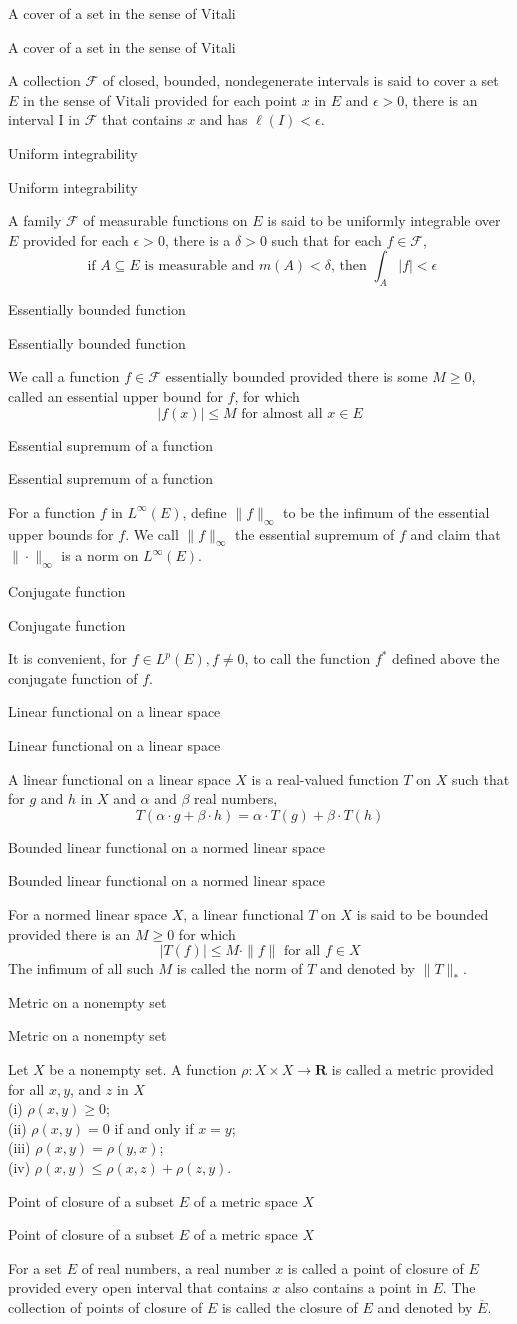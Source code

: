 \documentclass[17pt]{extarticle}
\renewcommand{\bar}[1]{\overline{#1}}
\newcommand{\boxset}[2]{\begin{mdframed}[style=darkQuesion]
#1
\end{mdframed}
\newpage
\begin{mdframed}[style=darkQuesion]
#1
  \end{mdframed}
\begin{mdframed}[style=darkAnswer]
#2
  \end{mdframed}
  \newpage
}
\begin{document}
\boxset{A cover of a set in the sense of Vitali}
{
A collection $\mathcal{F}$ of closed, bounded, nondegenerate intervals is said to cover a set $E$ in the sense of Vitali provided for each point $x$ in $E$ and $\epsilon>0$, there is an interval I in $\mathcal{F}$ that contains $x$ and has $\ell(I)<\epsilon$.
}
\boxset{Uniform integrability}
{
A family $\mathcal{F}$ of measurable functions on $E$ is said to be uniformly integrable over $E$ provided for each $\epsilon>0$, there is a $\delta>0$ such that for each $f \in \mathcal{F}$,
$$
\text { if } A \subseteq E \text { is measurable and } m(A)<\delta \text {, then } \int_{A}|f|<\epsilon
$$
}
\boxset{Essentially bounded function}
{
We call a function $f \in \mathcal{F}$ essentially bounded provided there is some $M \geq 0$, called an essential upper bound for $f$, for which
$$
|f(x)| \leq M \text { for almost all } x \in E
$$
}
\boxset{Essential supremum of a function}
{
For a function $f$ in $L^{\infty}(E)$, define $\|f\|_{\infty}$ to be the infimum of the essential upper bounds for $f$. We call $\|f\|_{\infty}$ the essential supremum of $f$ and claim that $\|\cdot\|_{\infty}$ is a norm on $L^{\infty}(E)$.
}
\boxset{Conjugate function}
{
It is convenient, for $f \in L^{p}(E), f \neq 0$, to call the function $f^{*}$ defined above the conjugate function of $f$.
}
\boxset{Linear functional on a linear space}
{
A linear functional on a linear space $X$ is a real-valued function $T$ on $X$ such that for $g$ and $h$ in $X$ and $\alpha$ and $\beta$ real numbers,
$$
T(\alpha \cdot g+\beta \cdot h)=\alpha \cdot T(g)+\beta \cdot T(h)
$$
}
\boxset{Bounded linear functional on a normed linear space}
{
For a normed linear space $X$, a linear functional $T$ on $X$ is said to be bounded provided there is an $M \geq 0$ for which
$$
|T(f)| \leq M \cdot\|f\| \text { for all } f \in X
$$
The infimum of all such $M$ is called the norm of $T$ and denoted by $\|T\|_{*}$.
}
\boxset{Metric on a nonempty set}
{
Let $X$ be a nonempty set. A function $\rho: X \times X \rightarrow \mathbf{R}$ is called a metric provided for all $x, y$, and $z$ in $X$\[\ \]
(i) $\rho(x, y) \geq 0$;\[\ \]
(ii) $\rho(x, y)=0$ if and only if $x=y$;\[\ \]
(iii) $\rho(x, y)=\rho(y, x)$;\[\ \]
(iv) $\rho(x, y) \leq \rho(x, z)+\rho(z, y)$.
}
\boxset{Point of closure of a subset $E$ of a metric space $X$}
{
For a set $E$ of real numbers, a real number $x$ is called a point of closure of $E$ provided every open interval that contains $x$ also contains a point in $E$. The collection of points of closure of $E$ is called the closure of $E$ and denoted by $\bar{E}$.
}
\end{document}
